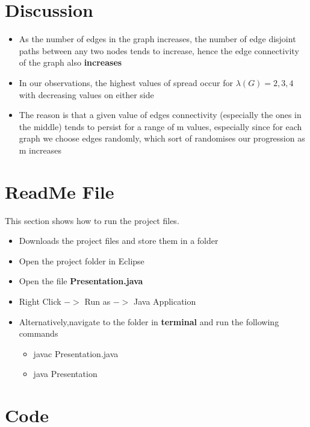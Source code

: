 \documentclass[12pt,letterpaper,titlepage,en-US]{article}
\begin{document}
\section{Discussion}
\begin{itemize}

\item As the number of edges in the graph increases, the number of edge disjoint paths between any two nodes tends to increase, hence the edge connectivity of the graph also \textbf{increases}

\item In our observations, the highest values of spread occur for $\lambda(G)=2,3,4$ with decreasing values on either side

\item The reason is that a given value of  edges connectivity (especially the ones in the middle) tends to persist for a range of m values, especially since for each graph we choose edges randomly, which sort of randomises our progression as m increases



\end{itemize}





  \section{ReadMe File}
  This section shows how to run the project files.
  \begin{itemize}
  \item Downloads the project files and store them in a folder
  \item Open the project folder in Eclipse
  \item Open the file \textbf{Presentation.java}
  \item Right Click $->$ Run as $->$ Java Application
  \item Alternatively,navigate to the folder in \textbf{terminal} and run the following commands
  \begin{itemize}
  \item javac Presentation.java
  \item java Presentation
  \end{itemize}
  \end{itemize}

  

 
\section{Code}
\end{document}
